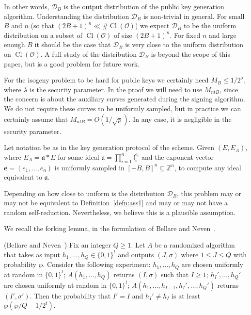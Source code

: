 \documentclass{llncs}
\newcommand{\D}{\mathcal{D}}
\newcommand{\OO}{\mathcal{O}}
\newcommand{\Z}{\mathbb{Z}}
\DeclareMathOperator{\Cl}{Cl}
\renewcommand{\a}{\mathfrak{a}}
\renewcommand{\l}{\mathfrak{l}}
\newcommand{\e}{\mathbf{e}}
\begin{document}
In other words, $\D_B$ is the output distribution of the public key generation algorithm.
Understanding the distribution $\D_B$ is non-trivial in general.
For small $B$ and $n$ (so that $(2B+1)^n \ll \#\Cl(\OO)$) we expect $\D_B$ to be the uniform distribution on a subset of $\Cl(\OO)$ of size $(2B+1)^n$. For fixed $n$ and large enough $B$ it should be the case that $\D_B$ is very close to the uniform distribution on $\Cl(\OO)$.
A full study of the distribution $\D_B$ is beyond the scope of this paper, but is a good problem for future work.

For the isogeny problem to be hard for public keys we certainly need $M_B \le 1/2^\lambda$, where $\lambda$ is the security parameter.
In the proof we will need to use $M_{ntB}$, since the concern is about the auxiliary curves generated during the signing algorithm. We do not require these curves to be uniformly sampled, but in practice we can certainly assume that $M_{ntB} = O( 1/\sqrt{p} )$. In any case, it is negligible in the security parameter.



\begin{definition} \label{defn:ass1p}
Let notation be as in the key generation protocol of the scheme.
Given $(E, E_A)$, where $E_A = \a * E$ for some ideal $\a = \prod_{i=1}^n \l_i^{e_i}$ and the exponent vector $\e = (e_1, \dots, e_n)$ is uniformly sampled in $[-B,B]^n \subseteq \Z^n$, to compute any ideal equivalent to $\a$.
\end{definition}

Depending on how close to uniform is the distribution $\D_B$, this problem may or may not be equivalent to Definition~\ref{defn:ass1} and may or may not have a random self-reduction.
Nevertheless, we believe this is a plausible assumption.


We recall the forking lemma, in the formulation of Bellare and Neven~\cite{BN06}.

\begin{lemma} \label{forking-lemma} (Bellare and Neven~\cite{BN06})
Fix an integer $Q \ge 1$. Let $A$ be a randomized algorithm that takes as input $h_1, \dots, h_Q \in \{0,1\}^t$ and outputs $(J, \sigma)$ where $ 1\le J \le Q$ with probability $\wp$.
Consider the following experiment: $h_1, \dots, h_Q$ are chosen uniformly at random in $\{0,1\}^t$; $A(h_1, \dots, h_Q )$ returns $(I,\sigma)$ such that $I \ge 1$; $h_I', \dots, h_Q'$ are chosen uniformly at random in $\{0,1\}^t$; $A( h_1, \dots, h_{I-1}, h_I', \dots, h_Q' )$ returns $(I', \sigma')$.
Then the probability that $I' = I$ and $h_{I}' \ne h_I$ is at least $\wp( \wp/Q - 1/2^t )$.
\end{lemma}
\end{document}
